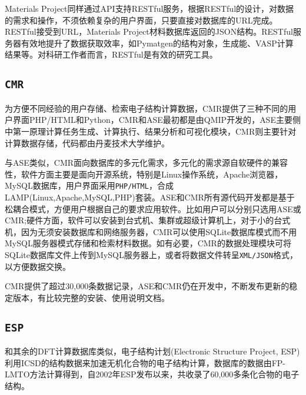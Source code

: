\textrm{Materials Project}同样通过\textrm{API}支持\textrm{RESTful}服务\cite{CMS68-314_2013}，根据\textrm{RESTful}的设计，对数据的需求和操作，不须依赖复杂的用户界面，只要直接对数据库的\textrm{URL}完成。\textrm{RESTful}接受到\textrm{URL}，\textrm{Materials Project}材料数据库返回的\textrm{JSON}结构。\textrm{RESTful}服务器有效地提升了数据获取效率，如\textrm{Pymatgen}的结构对象，\textrm{生成能}、\textrm{VASP}计算结果等。对科研工作者而言，\textrm{RESTful}是有效的研究工具。

\subsection{\tt{CMR}}
为方便不同经验的用户存储、检索电子结构计算数据，\textrm{CMR}提供了三种不同的用户界面\textrm{PHP/HTML和Python}\cite{CMR_URL}，\textrm{CMR}和\textrm{ASE}最初都是由\textrm{QMIP}开发的\cite{CSE14-51_2012}，\textrm{ASE}主要侧中第一原理计算任务生成、计算执行、结果分析和可视化模块，\textrm{CMR}则主要针对计算数据存储，代码都由丹麦技术大学维护。

与\textrm{ASE}类似，\textrm{CMR}面向数据库的多元化需求，多元化的需求源自软硬件的兼容性，软件方面主要是面向开源系统，特别是\textrm{Linux}操作系统，\textrm{Apache}浏览器，\textrm{MySQL}数据库，用户界面采用\texttt{PHP/HTML}，合成\textrm{LAMP}(\textrm{Linux,Apache,MySQL,PHP})套装。\textrm{ASE}和\textrm{CMR}所有源代码开发都是基于松耦合模式，方便用户根据自己的要求应用软件。比如用户可以分别只选用\textrm{ASE}或\textrm{CMR};硬件方面，软件可以安装到台式机、集群或超级计算机上，对于小的台式机，因为无须安装数据库和网络服务器，\textrm{CMR}可以使用\textrm{SQLite}数据库模式而不用\textrm{MySQL}服务器模式存储和检索材料数据。如有必要，\textrm{CMR}的数据处理模块可将\textrm{SQLite}数据库文件上传到\textrm{MySQL}服务器上，或者将数据文件转呈\texttt{XML/JSON}格式，以方便数据交换。

\textrm{CMR}提供了超过30,000条数据记录，\textrm{ASE}和\textrm{CMR}仍在开发中，不断发布更新的稳定版本，有比较完整的安装、使用说明文档。

\subsection{\tt{ESP}}
和其余的\textrm{DFT}计算数据库类似，电子结构计划\textrm{(Electronic Structure Project, ESP)}利用\textrm{ICSD}的结构数据来加速无机化合物的电子结构计算\cite{ESP_URL,CMS44-1042_2009}，数据库的数据由\textrm{FP-LMTO}方法计算得到，自2002年\textrm{ESP}发布以来，共收录了60,000多条化合物的电子结构。

